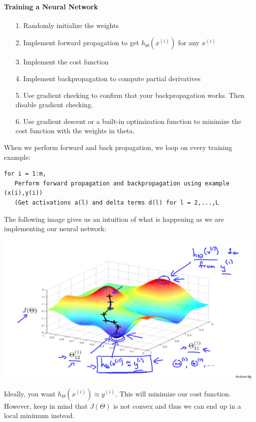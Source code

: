 \documentclass[UTF8]{article}
\begin{document}
\paragraph{Training a Neural Network}

\begin{itemize}
\item[{1.}]Randomly initialize the weights
\item[{2.}]Implement forward propagation to get $h_\Theta(x^{(i)})$ for any $x^{(i)}$
\item[{3.}]Implement the cost function
\item[{4.}]Implement backpropagation to compute partial derivatives
\item[{5.}]Use gradient checking to confirm that your backpropagation works. Then disable gradient checking.
\item[{6.}]Use gradient descent or a built-in optimization function to minimize the cost function with the weights in theta.
\end{itemize}

When we perform forward and back propagation, we loop on every training example:

\begin{lstlisting}
for i = 1:m,
   Perform forward propagation and backpropagation using example (x(i),y(i))
   (Get activations a(l) and delta terms d(l) for l = 2,...,L
\end{lstlisting}   

The following image gives us an intuition of what is happening as we are implementing our neural network:

\includegraphics[width = \textwidth]{NotePics/9_7_1.png}

Ideally, you want $h_\Theta(x^{(i)}) \approx y^{(i)}$. This will minimize our cost function. However, keep in mind that $J(\Theta)$ is not convex and thus we can end up in a local minimum instead.
\end{document}
